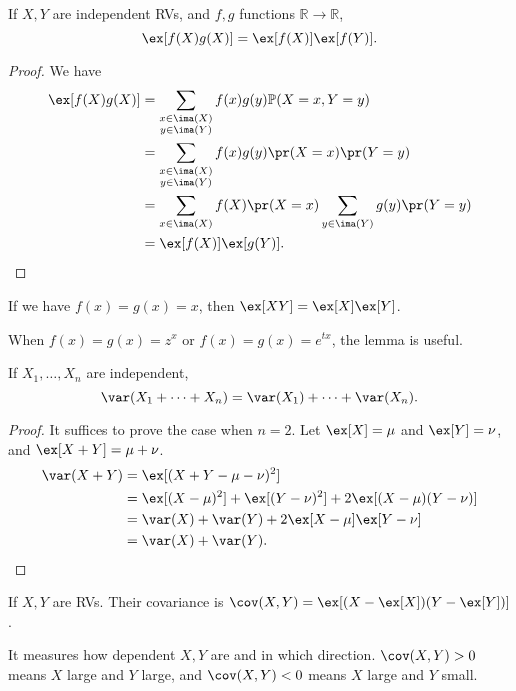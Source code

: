 \begin{lemma}{}{}
    If \(X, Y\) are independent RVs, and \(f, g\) functions \(\mathbb{R}\to \mathbb{R}\),
    \[
        \ex[f(X)g(X)] = \ex[f(X)]\ex[f(Y)].
    \]
\end{lemma}
\begin{proof}
    We have
    \begin{align*}
        \ex[f(X)g(X)] &= \sum_{\substack{x \in \ima(X)\\y\in\ima(Y)}} f(x)g(y) \mathbb{P}(X = x, Y=y)\\
        &= \sum_{\substack{x \in \ima(X)\\y\in\ima(Y)}} f(x)g(y) \pr(X = x)\pr(Y=y)\\
        &= \sum_{x \in \ima(X)}f(X)\pr(X = x) \sum_{y \in \ima(Y)}g(y) \pr(Y = y)\\
        &= \ex[f(X)]\ex[g(Y)].
    \end{align*}
\end{proof}
\begin{example}
    If we have \(f(x) = g(x) = x\), then \(\ex[XY] = \ex[X]\ex[Y]\).
\end{example}
\begin{example}
    When \(f(x) = g(x) = z^x\) or \(f(x) = g(x) = e^{tx}\), the lemma is useful.
\end{example}
\begin{lemma}{}{}
    If \(X_1, \dots, X_n\) are independent,
    \[
        \var(X_1 + \dots + X_n) = \var(X_1) + \dots + \var(X_n).
    \]
\end{lemma}
\begin{proof}
    It suffices to prove the case when \(n = 2\). Let \(\ex[X] = \mu\) and \(\ex[Y] = \nu\), and \(\ex[X + Y] = \mu + \nu\).
    \begin{align*}
        \var(X + Y) &= \ex[(X + Y - \mu - \nu)^2]\\
        &= \ex[(X - \mu)^2] + \ex[(Y - \nu)^2] + 2 \ex[(X - \mu)(Y - \nu)]\\
        &= \var(X) + \var(Y) + 2\ex[X - \mu]\ex[Y - \nu]\\
        &= \var(X) + \var(Y).
    \end{align*}
\end{proof}
\begin{definition}{}{}
    If \(X, Y\) are RVs. Their covariance is \(\cov(X, Y) = \ex[(X - \ex[X])(Y - \ex[Y])]\).
\end{definition}
\begin{remark}
    It measures how dependent \(X, Y\) are and in which direction. \(\cov(X, Y) > 0\) means \(X\) large and \(Y\) large, and \(\cov(X, Y) < 0\) means \(X\) large and \(Y\) small.
\end{remark}
